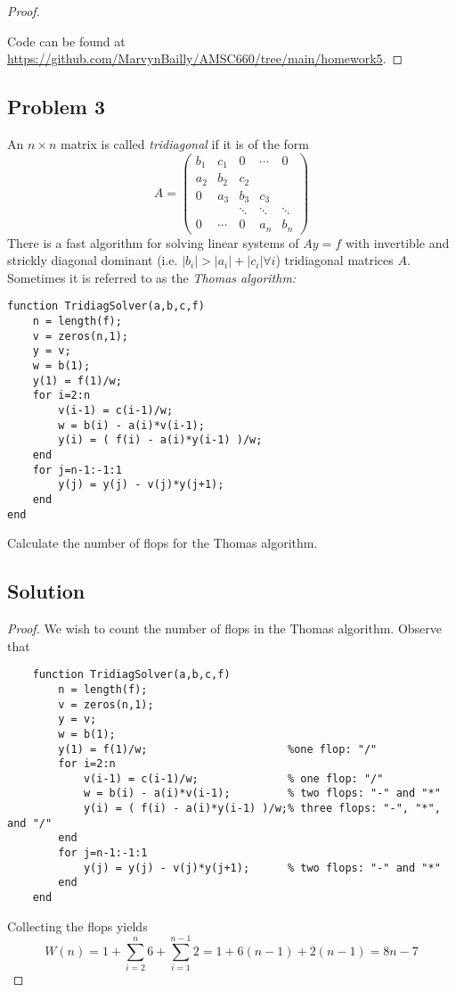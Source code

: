 \documentclass[12pt]{report}
\begin{document}
\begin{problem}
\begin{proof}
\begin{enumerate}
\end{enumerate}


Code can be found at \url{https://github.com/MarvynBailly/AMSC660/tree/main/homework5}.



\end{proof}
\end{problem}





\begin{problem}%
\subsection*{Problem 3}

An $n \times n$ matrix is called \textit{tridiagonal} if it is of the form
\[
     A = \begin{pmatrix}
        b_1 & c_1 & 0 & \cdots & 0\\
        a_2 & b_2 & c_2\\
        0 & a_3 & b_3 & c_3\\
        && \ddots & \ddots & \ddots\\
        0 & \cdots & 0 & a_n & b_n 
     \end{pmatrix}
\]
There is a fast algorithm for solving linear systems of $Ay = f$ with invertible and strickly diagonal dominant (i.e. $|b_i| > |a_i| + |c_i| \forall i$) tridiagonal matrices $A$. Sometimes it is referred to as the \textit{Thomas algorithm:} 
\begin{verbatim}
function TridiagSolver(a,b,c,f)
    n = length(f);
    v = zeros(n,1);
    y = v;
    w = b(1);
    y(1) = f(1)/w;
    for i=2:n
        v(i-1) = c(i-1)/w;
        w = b(i) - a(i)*v(i-1);
        y(i) = ( f(i) - a(i)*y(i-1) )/w;
    end
    for j=n-1:-1:1
        y(j) = y(j) - v(j)*y(j+1);
    end
end
\end{verbatim}
Calculate the number of flops for the Thomas algorithm. 

\subsection*{Solution}
\begin{proof}

We wish to count the number of flops in the Thomas algorithm. Observe that
\begin{verbatim}
    function TridiagSolver(a,b,c,f)
        n = length(f);
        v = zeros(n,1);
        y = v;
        w = b(1);
        y(1) = f(1)/w;                      %one flop: "/"
        for i=2:n
            v(i-1) = c(i-1)/w;              % one flop: "/" 
            w = b(i) - a(i)*v(i-1);         % two flops: "-" and "*"
            y(i) = ( f(i) - a(i)*y(i-1) )/w;% three flops: "-", "*", and "/"
        end
        for j=n-1:-1:1
            y(j) = y(j) - v(j)*y(j+1);      % two flops: "-" and "*"
        end
    end
\end{verbatim}
Collecting the flops yields
\[
     W(n) = 1 + \sum_{i=2}^n 6 + \sum_{i=1}^{n-1}2 = 1 + 6(n-1) + 2(n-1) = 8n  - 7
\]


\end{proof}
\end{problem}
\end{document}

